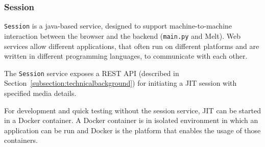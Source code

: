 \documentclass[12pt,a4paper]{article}
\begin{document}

\subsubsection{Session}

\texttt{Session} is a java-based service, designed to support machine-to-machine interaction between the browser and the backend (\texttt{main.py} and Melt). Web services allow different applications, that often run on different platforms and are written in different programming languages, to communicate with each other.~\cite{webservice}

The \texttt{Session} service exposes a REST API (described in Section~\ref{subsection:technicalbackground}) for initiating a JIT session with specified media details. 






%
%

For development and quick testing without the session service, JIT can be started in a Docker container. A Docker container is in isolated environment in which an application can be run and Docker is the platform that enables the usage of those containers.~\cite{docker}
\end{document}
